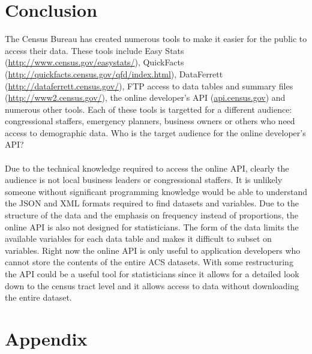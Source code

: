 \documentclass{article}\usepackage[]{graphicx}\usepackage[]{color}
\begin{document}
\section{Conclusion}
The Census Bureau has created numerous tools to make it easier for the public to access their data.  These tools include Easy Stats (\url{http://www.census.gov/easystats/}), QuickFacts (\url{http://quickfacts.census.gov/qfd/index.html}), DataFerrett (\url{http://dataferrett.census.gov/}), FTP access to data tables and summary files (\url{http://www2.census.gov/}), the online developer's API (\url{api.census.gov}) and numerous other tools.  Each of these tools is targetted for a different audience: congressional staffers, emergency planners, business owners or others who need access to demographic data.  Who is the target audience for the online developer's API?\\
\\
Due to the technical knowledge required to access the online API, clearly the audience is not local business leaders or congressional staffers.  It is unlikely someone without significant programming knowledge would be able to understand the JSON and XML formats required to find datasets and variables.  Due to the structure of the data and the emphasis on frequency instead of proportions, the online API is also not designed for statisticians.  The form of the data limits the available variables for each data table and makes it difficult to subset on variables.  Right now the online API is only useful to application developers who cannot store the contents of the entire ACS datasets.  With some restructuring the API could be a useful tool for statisticians since it allows for a detailed look down to the census tract level and it allows access to data without downloading the entire dataset.

\section{Appendix}

\printbibliography
\end{document}
